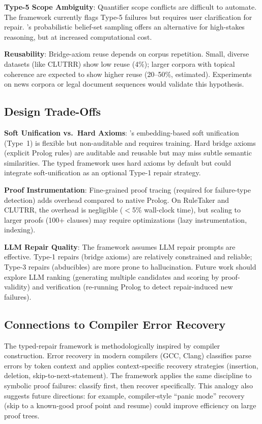 \documentclass[11pt,letterpaper]{article}
\begin{document}
\textbf{Type-5 Scope Ambiguity}: Quantifier scope conflicts are difficult to automate.
The framework currently flags Type-5 failures but requires user clarification for
repair. \citet{Jung2022}'s probabilistic belief-set sampling offers an alternative for
high-stakes reasoning, but at increased computational cost.

\textbf{Reusability}: Bridge-axiom reuse depends on corpus repetition. Small, diverse
datasets (like CLUTRR) show low reuse (4\%); larger corpora with topical coherence
are expected to show higher reuse (20--50\%, estimated). Experiments on news corpora
or legal document sequences would validate this hypothesis.

\subsection{Design Trade-Offs}

\textbf{Soft Unification vs.\ Hard Axioms}: \citet{Weber2019}'s embedding-based soft
unification (Type~1) is flexible but non-auditable and requires training. Hard bridge
axioms (explicit Prolog rules) are auditable and reusable but may miss subtle semantic
similarities. The typed framework uses hard axioms by default but could integrate
soft-unification as an optional Type-1 repair strategy.

\textbf{Proof Instrumentation}: Fine-grained proof tracing (required for failure-type
detection) adds overhead compared to native Prolog. On RuleTaker and CLUTRR, the
overhead is negligible ($<$5\% wall-clock time), but scaling to larger proofs (100+
clauses) may require optimizations (lazy instrumentation, indexing).

\textbf{LLM Repair Quality}: The framework assumes LLM repair prompts are effective.
Type-1 repairs (bridge axioms) are relatively constrained and reliable; Type-3 repairs
(abducibles) are more prone to hallucination. Future work should explore LLM ranking
(generating multiple candidates and scoring by proof-validity) and verification
(re-running Prolog to detect repair-induced new failures).

\subsection{Connections to Compiler Error Recovery}

The typed-repair framework is methodologically inspired by compiler construction.
Error recovery in modern compilers (GCC, Clang) classifies parse errors by token
context and applies context-specific recovery strategies (insertion, deletion,
skip-to-next-statement). The framework applies the same discipline to symbolic proof
failures: classify first, then recover specifically. This analogy also suggests future
directions: for example, compiler-style ``panic mode'' recovery (skip to a known-good
proof point and resume) could improve efficiency on large proof trees.
\end{document}
